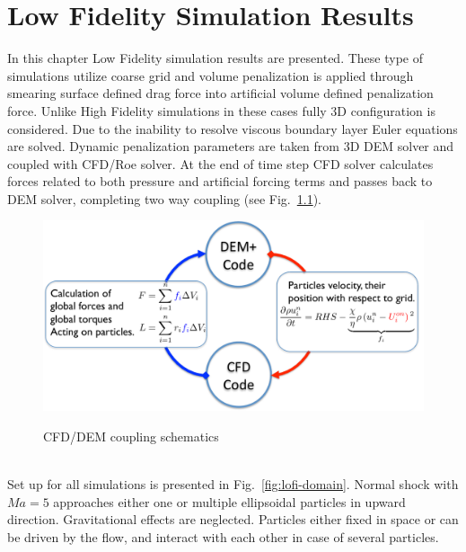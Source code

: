 \chapter{Low Fidelity Simulation Results}
\label{chapter:5}
In this chapter Low Fidelity simulation results are presented. These type of simulations utilize coarse grid and volume penalization is applied through smearing surface defined drag force into artificial volume defined penalization force. Unlike High Fidelity simulations in these cases fully 3D configuration is considered. Due to the inability to resolve viscous boundary layer Euler equations are solved. Dynamic penalization parameters are taken from 3D DEM solver and coupled with CFD/Roe solver. At the end of time step CFD solver calculates forces related to both pressure and artificial forcing terms and passes back to DEM solver, completing two way coupling (see Fig.~\ref{fig:coupling}).
\begin{figure}[h!]
\centering \includegraphics[scale=0.5]{fig/coupling.pdf}\\
\caption{CFD/DEM coupling schematics \label{fig:coupling}}
\end{figure}\\
Set up for all simulations is presented in Fig.~\ref{fig:lofi-domain}. Normal shock with $Ma=5$ approaches either one or multiple ellipsoidal particles in upward direction. Gravitational effects are neglected. Particles either fixed in space or can be driven by the flow, and interact with each other in case of several particles.
